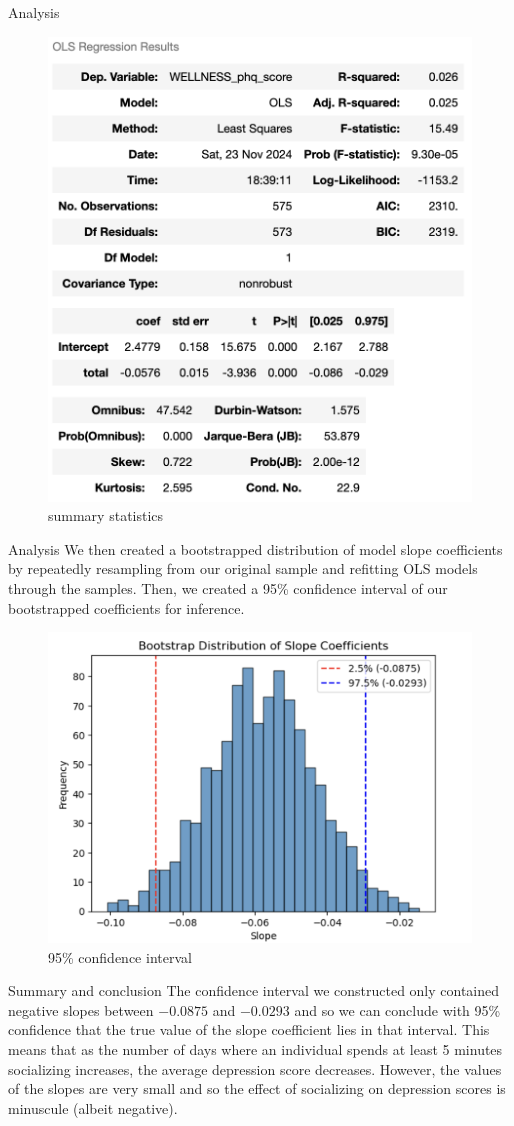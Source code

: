 \documentclass{beamer}
\begin{document}
\begin{frame}{Analysis}
    \begin{figure}
        \centering
        \includegraphics[width=0.5\linewidth]{summarystats.png}
        \caption{summary statistics}
        \label{fig:enter-label}
    \end{figure}
\end{frame}

\begin{frame}{Analysis}
    We then created a bootstrapped distribution of model slope coefficients by repeatedly resampling from our original sample and refitting OLS models through the samples. Then, we created a 95\% confidence interval of our bootstrapped coefficients for inference.
    \begin{figure}
        \centering
        \includegraphics[width=0.5\linewidth]{95CI.png}
        \caption{95\% confidence interval}
        \label{fig:enter-label}
    \end{figure}
\end{frame}

\begin{frame}{Summary and conclusion}
The confidence interval we constructed only contained negative slopes between $-0.0875$ and $-0.0293$ and so we can conclude with 95\% confidence that the true value of the slope coefficient lies in that interval. This means that as the number of days where an individual spends at least 5 minutes socializing increases, the average depression score decreases. However, the values of the slopes are very small and so the effect of socializing on depression scores is minuscule (albeit negative).
    
\end{frame}
\end{document}
